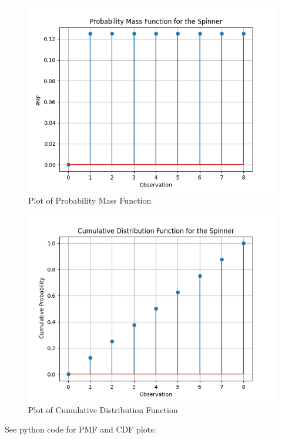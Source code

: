 \documentclass[journal,12pt,twocolumn]{IEEEtran}
\begin{document}
\begin{figure}
    \includegraphics[width=\columnwidth]{figs/pmf.png}
\caption{Plot of Probability Mass Function}
\label{fig:pmf}
\end{figure}

\begin{figure}
    \includegraphics[width=\columnwidth]{figs/cdf.png}
\caption{Plot of Cumulative Distribution Function}
\label{fig:cdf}
\end{figure}

See python code for PMF and CDF plots:\cite{plot}
\end{document}
